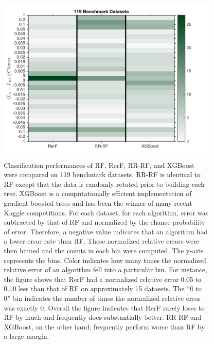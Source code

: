 \documentclass[simplex.tex]{subfiles}
\begin{document}
\begin{figure}[h!]
\begin{cframed}
\centering
\includegraphics[height=0.5\textheight]{./figs/rerF_benchmark.png}
\caption{
Classification performances of RF, RerF, RR-RF, and XGBoost were
compared on 119 benchmark datasets. RR-RF is identical to RF except that
the data is randomly rotated prior to building each tree. XGBoost is a
computationally efficient implementation of gradient boosted trees and
has been the winner of many recent Kaggle competitions. For each
dataset, for each algorithm, error was subtracted by that of RF and
normalized by the chance probability of error. Therefore, a negative
value indicates that an algorithm had a lower error rate than RF. These
normalized relative errors were then binned and the counts in each bin
were computed. The y-axis represents the bins. Color indicates how many
times the normalized relative error of an algorithm fell into a
particular bin. For instance, the figure shows that RerF had a
normalized relative error 0.05 to 0.10 less than that of RF on
approximately 15 datasets. The ``0 to 0'' bin indicates the number of
times the normalized relative error was exactly 0. Overall the figure
indicates that RerF rarely loses to RF by much and frequently does
substantially better. RR-RF and XGBoost, on the other hand, frequently
perform worse than RF by a large margin.
}
\label{fig:RefF3}
\end{cframed}
\end{figure}

\end{document}
